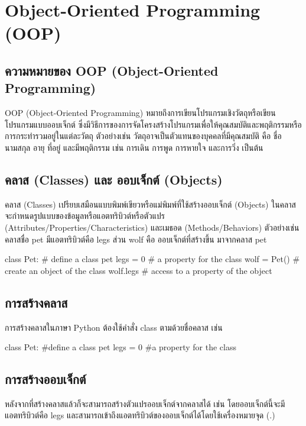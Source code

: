 \chapter{Object-Oriented Programming (OOP)}
\section{ความหมายของ OOP (Object-Oriented Programming)}

OOP (Object-Oriented Programming) หมายถึงการเขียนโปรแกรมเชิงวัตถุหรือเขียนโปรแกรมแบบออบเจ็กต์ ซึ่งมีวิธีการของการจัดโครงสร้างโปรแกรมเพื่อให้คุณสมบัติและพฤติกรรมหรือการกระทำรวมอยู่ในแต่ละวัตถุ \cite{Mar11} ตัวอย่างเช่น วัตถุอาจเป็นตัวแทนของบุคคลที่มีคุณสมบัติ คือ ชื่อ นามสกุล อายุ ที่อยู่ และมีพฤติกรรม เช่น การเดิน การพูด การหายใจ และการวิ่ง เป็นต้น

\section{คลาส (Classes) และ ออบเจ็กต์ (Objects)}

คลาส (Classes) เปรียบเสมือนแบบพิมพ์เขียวหรือแม่พิมพ์ที่ใช้สร้างออบเจ็กต์ (Objects) ในคลาสจะกำหนดรูปแบบของข้อมูลหรือแอตทริบิวต์หรือตัวแปร (Attributes/Properties/Characteristics) และเมธอด (Methods/Behaviors) ตัวอย่างเช่น คลาสชื่อ pet มีแอตทริบิวต์คือ legs ส่วน wolf คือ ออบเจ็กต์ที่สร้างขึ้น มาจากคลาส pet 

\begin{pycode}
class Pet: # define a class pet
    legs = 0  # a property for the class
    wolf = Pet() # create an object of the class 
    wolf.legs # access to a property of the object
\end{pycode}

\section{การสร้างคลาส}

การสร้างคลาสในภาษา Python ต้องใช้คำสั่ง class ตามด้วยชื่อคลาส เช่น

\begin{pycode}
class Pet: #define a class pet
    legs = 0 #a property for the class
\end{pycode}


\section{การสร้างออบเจ็กต์}

หลังจากที่สร้างคลาสแล้วก็จะสามารถสร้างตัวแปรออบเจ็กต์จากคลาสได้ เช่น  โดยออบเจ็กต์นี้จะมีแอตทริบิวต์คือ legs และสามารถเข้าถึงแอตทริบิวต์ของออบเจ็กต์ได้โดยใช้เครื่องหมายจุด (.) 

